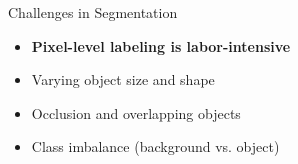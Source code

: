 \begin{frame}{Challenges in Segmentation}
    \begin{itemize}
        \item \textbf{Pixel-level labeling is labor-intensive}
        \item Varying object size and shape
        \item Occlusion and overlapping objects
        \item Class imbalance (background vs. object)
    \end{itemize}
\end{frame}